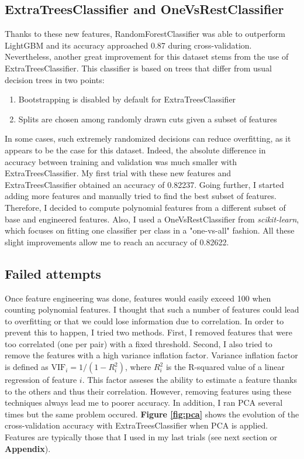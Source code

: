 \documentclass{article}
\begin{document}
\begin{multicols}{2}
\subsection{ExtraTreesClassifier and OneVsRestClassifier}

Thanks to these new features, RandomForestClassifier was able to outperform
LightGBM and its accuracy approached 0.87 during cross-validation.
Nevertheless, another great 
improvement
for this dataset stems from the use of ExtraTreesClassifier. This classifier is
based on trees that differ from usual decision trees in two points:

\begin{enumerate}[wide, labelindent=5pt, itemsep=0pt, topsep=0pt]
  \item Bootstrapping is disabled by default for ExtraTreesClassifier
  \item Splits are chosen among randomly drawn cuts given a subset of features
\end{enumerate}

In some cases, such extremely randomized decisions can reduce overfitting,
as it appears to be the case for this dataset. Indeed, the absolute difference in
accuracy between training and validation was much smaller with ExtraTreesClassifier.
My first trial with these
new features and ExtraTreesClassifier obtained an accuracy of 0.82237. Going further,
I started adding more features and manually tried to find the best subset of
features. Therefore, I decided to compute polynomial features from a different
subset of base and engineered features. Also, I used a OneVsRestClassifier from
\textit{scikit-learn}, which focuses on fitting one classifier per class in
a "one-vs-all" fashion. All these slight improvements allow me to reach an accuracy of 0.82622.

\subsection{Failed attempts}

Once feature engineering was done, features would easily 
exceed 100 when counting 
polynomial features. I thought that such a number of features could lead to 
overfitting or that we could lose information due to correlation. In order 
to prevent this to happen, I tried two methods. First, I removed features that 
were too correlated (one per pair) with a fixed threshold. Second, 
I also tried to remove the features with a high variance inflation factor. 
Variance inflation factor is defined as $\text{VIF}_i = 1/(1 - R_i^2)$,
where $R_i^2$ is the R-squared value of a linear regression of feature 
$i$. This factor asseses the ability to estimate a feature thanks to the 
others and thus their correlation. However, removing features using these 
techniques always lead me to poorer accuracy. In addition, I 
ran PCA several times but the same problem occured.
\textbf{Figure \ref{fig:pca}} shows the evolution of the cross-validation 
accuracy with ExtraTreesClassifier when PCA is applied. Features are typically 
those that I used in my last trials (see next section or \textbf{Appendix}).


\end{multicols}
\end{document}
